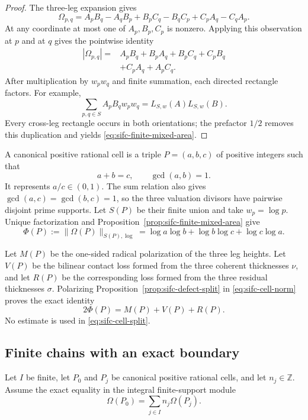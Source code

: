 \begin{proof}
The three-leg expansion gives
\[
 \Omega_{p,q}
 =A_pB_q-A_qB_p+B_pC_q-B_qC_p+C_pA_q-C_qA_p.
\]
At any coordinate at most one of $A_p,B_p,C_p$ is nonzero.  Applying this
observation at $p$ and at $q$ gives the pointwise identity
\begin{align*}
 |\Omega_{p,q}|={}&A_pB_q+B_pA_q+B_pC_q+C_pB_q\\
                  &+C_pA_q+A_pC_q.
\end{align*}
After multiplication by $w_pw_q$ and finite summation, each directed
rectangle factors.  For example,
\[
 \sum_{p,q\in S}A_pB_qw_pw_q=L_{S,w}(A)L_{S,w}(B).
\]
Every cross-leg rectangle occurs in both orientations; the prefactor
$1/2$ removes this duplication and yields
\eqref{eq:sifc-finite-mixed-area}.
\end{proof}

A canonical positive rational cell is a triple $P=(a,b,c)$ of positive
integers such that
\[
 a+b=c,\qquad \gcd(a,b)=1.
\]
It represents $a/c\in(0,1)$.  The sum relation also gives
$\gcd(a,c)=\gcd(b,c)=1$, so the three valuation divisors have pairwise
disjoint prime supports.  Let $S(P)$ be their finite union and take
$w_p=\log p$.  Unique factorization and
Proposition~\ref{prop:sifc-finite-mixed-area} give
\begin{equation}
 \Phi(P):=\|\Omega(P)\|_{S(P),\log}
 =\log a\log b+\log b\log c+\log c\log a.
 \label{eq:sifc-cell-norm}
\end{equation}

Let $M(P)$ be the one-sided radical polarization of the three leg heights.
Let $V(P)$ be the bilinear contact loss formed from the three coherent
thicknesses $\nu$, and let $R(P)$ be the corresponding loss formed from the
three residual thicknesses $\sigma$.  Polarizing
Proposition~\ref{prop:sifc-defect-split} in
\eqref{eq:sifc-cell-norm} proves the exact identity
\begin{equation}
 2\Phi(P)=M(P)+V(P)+R(P).
 \label{eq:sifc-cell-split}
\end{equation}
No estimate is used in \eqref{eq:sifc-cell-split}.

\subsection{Finite chains with an exact boundary}

Let $I$ be finite, let $P_0$ and $P_j$ be canonical positive rational
cells, and let $n_j\in\mathbb Z$.  Assume the exact equality in the integral
finite-support module
\begin{equation}
 \Omega(P_0)=\sum_{j\in I}n_j\Omega(P_j).
 \label{eq:sifc-exact-boundary}
\end{equation}

